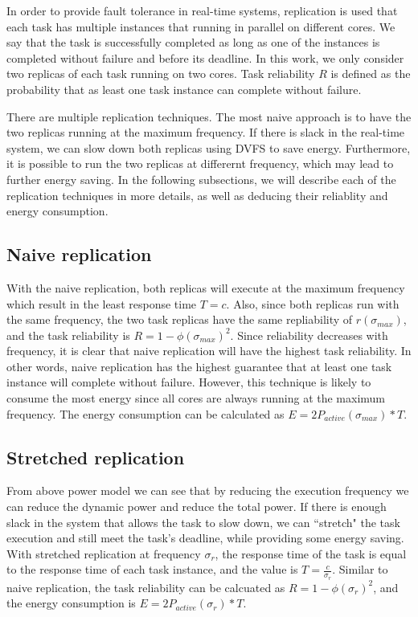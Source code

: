 In order to provide fault tolerance in real-time systems, replication is used that each task has multiple instances that running in parallel on different cores. We say that the task is successfully completed as long as one of the instances is completed without failure and before its deadline. In this work, we only consider two replicas of each task running on two cores. 
Task reliability $R$ is defined as the probability that as least one task instance can complete without failure.

There are multiple replication techniques. The most naive approach is to have the two replicas running at the maximum frequency. If there is slack in the real-time system, we can slow down both replicas using DVFS to save energy. Furthermore, it is possible to run the two replicas at differernt frequency, which may lead to further energy saving. In the following subsections, we will describe each of the replication techniques in more details, as well as deducing their reliablity and energy consumption.

\subsection{Naive replication}
With the naive replication, both replicas will execute at the maximum frequency which result in the least response time $T=c$.  
Also, since both replicas run with the same frequency, the two task replicas have the same repliability of $r(\sigma_{max})$, and the task reliability is $R=1 - \phi(\sigma_{max})^2$. Since reliability decreases with frequency, it is clear that naive replication will have the highest task reliability. In other words, naive replication has the highest guarantee that at least one task instance will complete without failure. However, this technique is likely to consume the most energy since all cores are always running at the maximum frequency. The energy consumption can be calculated as $E=2P_{active}(\sigma_{max}) * T$.

\subsection{Stretched replication}
From above power model we can see that by reducing the execution frequency we can reduce the dynamic power and reduce the total power. If there is enough slack in the system that allows the task to slow down, we can ``stretch" the task execution and still meet the task's deadline, while providing some energy saving. With stretched replication at frequency $\sigma_r$, the response time of the task is equal to the response time of each task instance, and the value is $T=\frac{c}{\sigma_r}$. Similar to naive replication, the task reliability can be calcuated as $R=1 - \phi(\sigma_r)^2$, and the energy consumption is $E=2P_{active}(\sigma_r) * T$.


